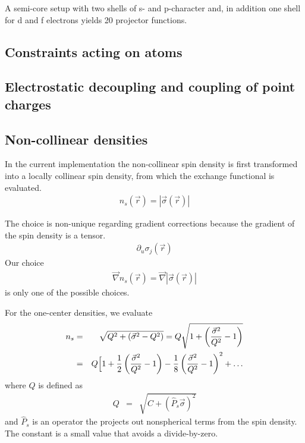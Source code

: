 \documentclass[final,12pt]{article}
\begin{document}
{{{{{{A semi-core setup with two shells of s- and p-character and, in
addition one shell for d and f electrons yields 20 projector
functions.




\subsection{Constraints acting on atoms}


\subsection{Electrostatic decoupling and coupling of point charges}

\subsection{Non-collinear densities}
\label{sec:noncollinear}
In the current implementation the non-collinear spin density is first
transformed into a locally collinear spin density, from which the
exchange functional is evaluated. 
\begin{eqnarray*}
n_s(\vec{r})= |\vec{\sigma}(\vec{r})|
\end{eqnarray*}

The choice is non-unique regarding gradient corrections because the
gradient of the spin density is a tensor.
\begin{eqnarray*}
\partial_u\sigma_j(\vec{r})
\end{eqnarray*}
Our choice
\begin{eqnarray*}
\vec{\nabla}n_s(\vec{r})=\vec{\nabla}|\vec{\sigma}(\vec{r})|
\end{eqnarray*}
is only one of the possible choices. 


For the one-center densities, we evaluate
\begin{eqnarray*}
n_s&=&\sqrt{Q^2+\left(\vec{\sigma}^2-Q^2\right)}
=Q\sqrt{1+\left(\frac{\vec{\sigma}^2}{Q^2}-1\right)}
\\
&=&Q\Bigl[1+\frac{1}{2}\left(\frac{\vec{\sigma}^2}{Q^2}-1\right)
-\frac{1}{8}\left(\frac{\vec{\sigma}^2}{Q^2}-1\right)^2+\ldots
\end{eqnarray*}
where $Q$ is defined as
\begin{eqnarray*}
Q&=&\sqrt{C+(\hat{P}_s\vec{\sigma})^2}
\end{eqnarray*}
and $\hat{P}_s$ is an operator the projects out nonspherical terms
from the spin density. The constant is a small value that avoids a 
divide-by-zero.

}}}}}}
\end{document}
